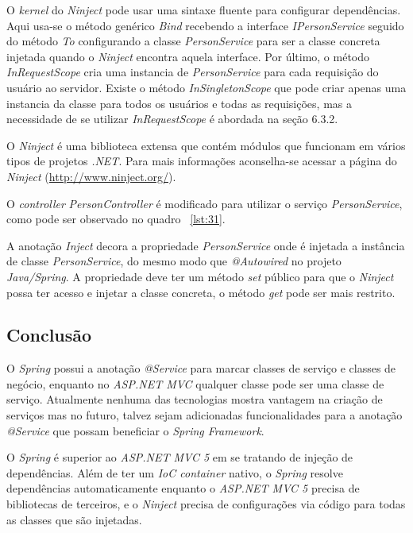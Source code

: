 \documentclass[a4paper,12pt]{article}
\newcommand{\est}[1] {
\textit{#1}}
\newcommand{\classe}[1] {
\textit{#1}}
\newcommand{\sigla}[1] {
\textit{#1}}
\newcommand{\annotation}[1] {
\textit{#1}}
\newcommand{\metodo}[1] {
\textit{#1}}
\newcommand{\sharpcode}[3] {
	
}
\begin{document}
\sharpcode{code/30.txt}{Registro de dependências no \est{Ninject}}{lst:30}

O \est{kernel} do \est{Ninject} pode usar uma sintaxe fluente para configurar dependências. Aqui usa-se o método genérico \metodo{Bind} recebendo a interface \classe{IPersonService} seguido do método \metodo{To} configurando a classe \classe{PersonService} para ser a classe concreta injetada quando o \est{Ninject} encontra aquela interface. Por último, o método \metodo{InRequestScope} cria uma instancia de \classe{PersonService} para cada requisição do usuário ao servidor. Existe o método \metodo{InSingletonScope} que pode criar apenas uma instancia da classe para todos os usuários e todas as requisições, mas a necessidade de se utilizar \metodo{InRequestScope} é abordada na seção 6.3.2.

O \est{Ninject} é uma biblioteca extensa que contém módulos que funcionam em vários tipos de projetos \sigla{.NET}. Para mais informações aconselha-se acessar a página do \est{Ninject} (\url{http://www.ninject.org/}).

O \est{controller} \classe{PersonController} é modificado para utilizar o serviço \classe{PersonService}, como pode ser observado no quadro ~\ref{lst:31}.

\sharpcode{code/31.txt}{\classe{PersonController} do projeto \est{ASP.NET MVC} usando \classe{PersonService}}{lst:31}

A anotação \annotation{Inject} decora a propriedade \classe{PersonService} onde é injetada a instância de classe \classe{PersonService}, do mesmo modo que \annotation{@Autowired} no projeto \est{Java/Spring}. A propriedade deve ter um método \metodo{set} público para que o \est{Ninject} possa ter acesso e injetar a classe concreta, o método \metodo{get} pode ser mais restrito.

\subsection{Conclusão}

O \est{Spring} possui a anotação \annotation{@Service} para marcar classes de serviço e classes de negócio, enquanto no \est{ASP.NET MVC} qualquer classe pode ser uma classe de serviço. Atualmente nenhuma das tecnologias mostra vantagem na criação de serviços mas no futuro, talvez sejam adicionadas funcionalidades para a anotação \annotation{@Service} que possam beneficiar o \est{Spring Framework}.

O \est{Spring} é superior ao \est{ASP.NET MVC 5} em se tratando de injeção de dependências. Além de ter um \est{IoC container} nativo, o \est{Spring} resolve dependências automaticamente enquanto o \est{ASP.NET MVC 5} precisa de bibliotecas de terceiros, e o \est{Ninject} precisa de configurações via código para todas as classes que são injetadas.
\end{document}
